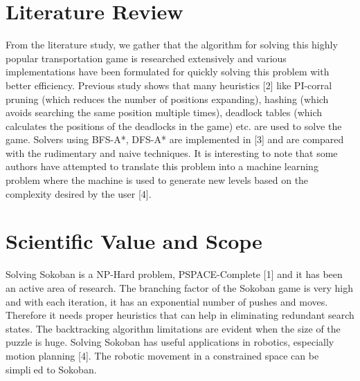 \documentclass[10pt, final]{article}
\begin{document}
\begin{multicols}{2}
	\section{Literature Review}
	From the literature study, we gather that the algorithm for solving this highly popular transportation game is researched extensively and various implementations have been formulated for quickly solving this problem with better efficiency. Previous study shows that many heuristics [2] like PI-corral pruning (which reduces the number of positions expanding), hashing (which avoids searching the same position multiple times), deadlock	tables (which calculates the positions of the deadlocks in the game) etc. are used to solve the game. Solvers	using BFS-A*, DFS-A* are implemented in [3] and are compared with the rudimentary and naive techniques. It is interesting to note that some authors have attempted to translate this problem into a machine learning problem where the machine is used to generate new levels based on the complexity desired by the user [4].
	\section{Scientific Value and Scope}
	Solving Sokoban is a NP-Hard problem, PSPACE-Complete [1] and it has been an active area of research. The branching factor of the Sokoban game is very high and with each iteration, it has an exponential number of pushes and moves. Therefore it needs proper heuristics that can help in eliminating redundant search states. The backtracking algorithm limitations are evident when the size of the puzzle is huge. Solving Sokoban has useful applications in robotics, especially motion planning [4]. The robotic movement in a	constrained space can be simplied to Sokoban.

\end{multicols}
\end{document}
